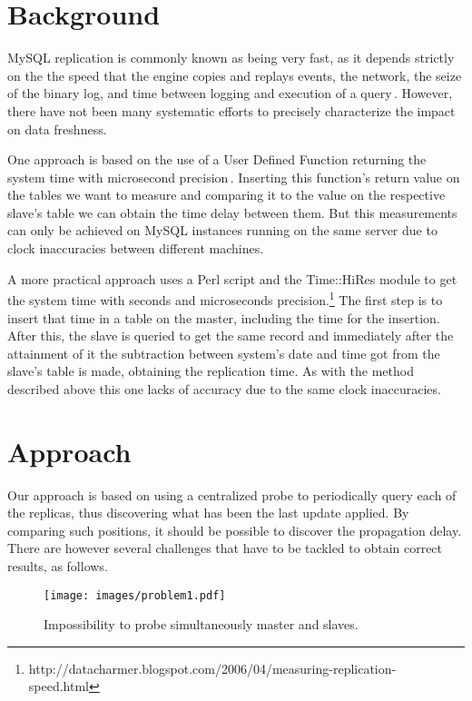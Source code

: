 \section{Background}

MySQL replication is commonly known as being very fast, as it depends strictly on the 
the speed that the engine copies and replays events, the network, the seize of the binary log, and time between logging and execution of a query\,\cite{Schwartz:1118024}. However, there have not been many systematic efforts to precisely characterize the impact on data freshness.

One approach is based on the use of a User Defined Function returning the system time with microsecond precision\,\cite{Schwartz:1118024}. Inserting this function's return value on the tables we want to measure and comparing it to the value on the respective slave's table we can obtain the time delay between them. But this measurements can only be achieved on MySQL instances running on the same server due to clock inaccuracies between different machines. 

A more practical approach uses a Perl script and the Time::HiRes module to get the system time with seconds and microseconds precision.\footnote{http://datacharmer.blogspot.com/2006/04/measuring-replication-speed.html} The first step is to insert that time in a table on the master, including the time for the insertion. After this, the slave is queried to get the same record and immediately after the attainment of it the subtraction between system's date and time got from the slave's table is made, obtaining the replication time. 
As with the method described above this one lacks of accuracy due to the same clock inaccuracies.

\section{Approach}

Our approach is based on using a centralized probe to periodically query each of the replicas, thus discovering what has been the last update applied. By comparing such positions, it should be possible to discover the propagation delay. There are however several challenges that have to be tackled to obtain correct results, as follows. \\

\begin{figure}[t]
\centering    
\texttt{[image: images/problem1.pdf]}
\caption{Impossibility to probe simultaneously master and slaves.}
\label{fig:problem1}
\end{figure}


